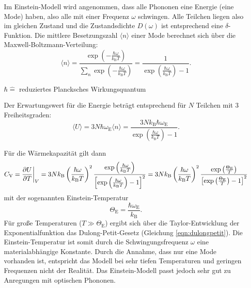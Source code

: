 Im Einstein-Modell wird angenommen, dass alle Phononen eine Energie (eine Mode) haben, also alle mit einer Frequenz $\omega$ schwingen.
Alle Teilchen liegen also im gleichen Zustand und die Zustandsdichte $D(\omega)$ ist entsprechend eine $\delta$-Funktion.
Die mittlere Besetzungszahl $\langle n \rangle$ einer Mode berechnet sich über die Maxwell-Boltzmann-Verteilung:
\begin{equation*}
	\langle n \rangle = \frac{\exp{ \left( -\frac{\hbar \omega}{k_{\text{B}} T} \right)}}{ \sum_{n} \exp{\left( -\frac{\hbar \omega}{k_{\text{B}} T} \right)}} = \frac{1}{ \exp{ \left( \frac{\hbar \omega}{k_{\text{B}} T} \right)}-1}.
\end{equation*}
\begin{center}
	\tiny{$\hbar \widehat{=}$ reduziertes Plancksches Wirkungsquantum}
\end{center}
Der Erwartungswert für die Energie beträgt entsprechend für $N$ Teilchen mit 3 Freiheitsgraden:
\begin{equation*}
	\langle U \rangle = 3 N  \hbar \omega_{\text{E}} \langle n \rangle  = \frac{3 N k_{\text{B}} \hbar \omega_{\text{E}}}{\exp{\left( \frac{ \hbar \omega }{ k_{\text{B}} T } \right)} - 1}.
\end{equation*}

Für die Wärmekapazität gilt dann
\begin{equation*}
	C_{\text{V}} = \frac{\partial U}{\partial T} \bigg{\vert}_{V} = 3 N k_{\text{B}} \left( \frac{\hbar \omega}{k_{\text{B}} T} \right)^2
	\frac{ \exp{\left( \frac{ \hbar \omega }{ k_{\text{B}} T } \right)} }{ \left[ \exp{\left( \frac{ \hbar \omega }{ k_{\text{B}} T } \right)} - 1 \right]^2 } =
	3 N k_{\text{B}} \left( \frac{\hbar \omega}{k_{\text{B}} T} \right)^2
	\frac{ \exp{\left( \frac{ \Theta_{\text{E}} }{ T } \right)} }{ \left[ \exp{\left( \frac{ \Theta_{\text{E}} }{ T } \right)} - 1 \right]^2 }
\end{equation*}
mit der sogenannten Einstein-Temperatur
\begin{equation*}
	\Theta_{\text{E}} = \frac{\hbar \omega_{\text{E}}}{k_{\text{B}}}.
\end{equation*}
Für große Temperaturen ($T \gg \Theta_{\text{E}}$) ergibt sich über die Taylor-Entwicklung der Exponentialfunktion das Dulong-Petit-Gesetz (Gleichung \eqref{eqn:dulongpetit}).
Die Einstein-Temperatur ist somit durch die Schwingungsfrequenz $\omega$ eine materialabhängige Konstante.
Durch die Annahme, dass nur eine Mode vorhanden ist, entspricht das Modell bei sehr tiefen Temperaturen und geringen Frequenzen nicht der Realität.
Das Einstein-Modell passt jedoch sehr gut zu Anregungen mit optischen Phononen.

